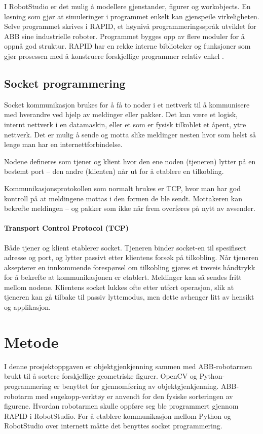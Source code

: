\documentclass[conference]{IEEEtran}
\begin{document}
        I RobotStudio er det mulig å modellere gjenstander, figurer og workobjects. En løsning som gjør at simuleringer i programmet enkelt kan 
        gjenspeile virkeligheten. Selve programmet skrives i RAPID, et høynivå programmeringsspråk utviklet for ABB sine industrielle roboter. 
        Programmet bygges opp av flere moduler for å oppnå god struktur. RAPID har en rekke interne biblioteker og funksjoner som gjør prosessen 
        med å konstruere forskjellige programmer relativ enkel \cite{teori:RobStud} \cite{teori:RobStud1}. 

    \subsection{Socket programmering}
        Socket kommunikasjon brukes for å få to noder i et nettverk til å kommunisere med hverandre ved hjelp av meldinger eller pakker. Det kan 
        være et logisk, internt nettverk i en datamaskin, eller et som er fysisk tilkoblet et åpent, ytre nettverk. Det er mulig å sende og motta 
        slike meldinger nesten hvor som helst så lenge man har en internettforbindelse.

        Nodene defineres som tjener og klient hvor den ene noden (tjeneren) lytter på en bestemt port – den andre (klienten) når ut for å etablere 
        en tilkobling.

        Kommunikasjonsprotokollen som normalt brukes er TCP, hvor man har god kontroll på at meldingene mottas i den formen de ble sendt. Mottakeren 
        kan bekrefte meldingen – og pakker som ikke når frem overføres på nytt av avsender.
        \paragraph{Transport Control Protocol (TCP)}
            Både tjener og klient etablerer socket. Tjeneren binder socket-en til spesifisert adresse og port, og lytter passivt etter klientens 
            forsøk på tilkobling. Når tjeneren aksepterer en innkommende forespørsel om tilkobling gjøres et treveis håndtrykk for å bekrefte at 
            kommunikasjonen er etablert. Meldinger kan så sendes fritt mellom nodene. Klientens socket lukkes ofte etter utført operasjon, slik at 
            tjeneren kan gå tilbake til passiv lyttemodus, men dette avhenger litt av hensikt og applikasjon.
    
\section{Metode}
    I denne prosjektoppgaven er objektgjenkjenning sammen med ABB-robotarmen brukt til å sortere forskjellige geometriske figurer. OpenCV og 
    Python-programmering er benyttet for gjennomføring av objektgjenkjenning. ABB-robotarm med sugekopp-verktøy er anvendt for den fysiske 
    sorteringen av figurene. Hvordan robotarmen skulle oppføre seg ble programmert gjennom RAPID i RobotStudio. For å etablere kommunikasjon 
    mellom Python og RobotStudio over internett måtte det benyttes socket programmering.
\end{document}
